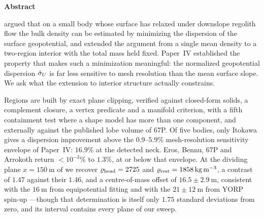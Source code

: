 {\noindent\large\bfseries Abstract}\\[0.4em]
{\noindent
\citet{richardson2014} argued that on a small body whose surface has
relaxed under downslope regolith flow the bulk density can be estimated
by minimizing the dispersion of the surface geopotential, and
\citet{kanamaru2019} extended the argument from a single mean density to
a two-region interior with the total mass held fixed. Paper~IV
established the property that makes such a minimization meaningful: the
normalized geopotential dispersion $\tilde{\sigma}_{U}$ is far less sensitive to
mesh resolution than the mean surface slope. We ask what the extension
to interior structure actually constrains.

Regions are built by exact plane clipping, verified against closed-form
solids, a complement closure, a vertex predicate and a manifold criterion,
with a fifth containment test where a shape model has more than one
component, and externally against the published lobe volume of 67P. Of five bodies, only Itokawa gives a dispersion
improvement above the $0.9$--$5.9\%$ mesh-resolution sensitivity
envelope of Paper~IV: $16.9\%$ at the detected neck. Eros, Bennu, 67P
and Arrokoth return $<10^{-3}\%$ to $1.3\%$, at or below that envelope.
At the dividing plane $x=\SI{150}{\metre}$ of \citet{kanamaru2019} we
recover $\varrho_{\mathrm{head}}=2725$ and $\varrho_{\mathrm{rest}}=\SI{1858}{\kilo\gram\per\cubic\metre}$,
a contrast of $1.47$ against their $1.46$, and a centre-of-mass offset of
$16.5\pm\SI{2.9}{\metre}$, consistent with the $\SI{16}{\metre}$ from
equipotential fitting and with the $21\pm\SI{12}{\metre}$ from YORP spin-up
\citep{lowry2014}---though that determination is itself only $1.75$ standard
deviations from zero, and its interval contains every plane of our sweep.

}
